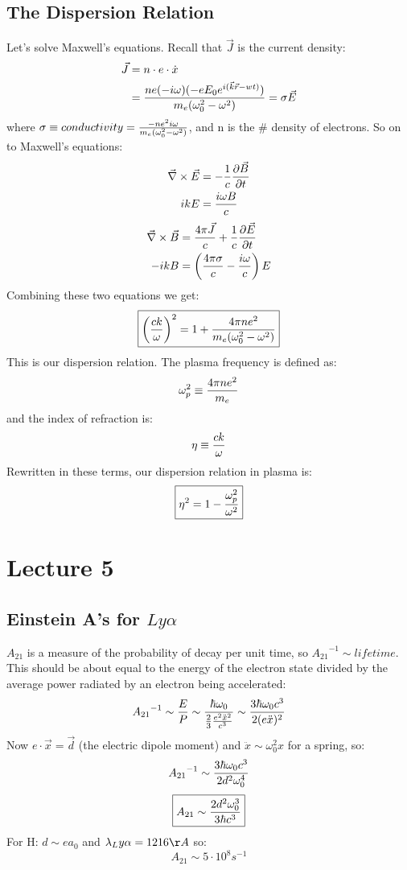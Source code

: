 \documentclass[11pt]{article}
\def\.{\dot}
\def\tr{\nabla}
\def\dce{\vec\tr\times\vec E}
\def\dcb{\vec\tr\times\vec B}
\def\wz{\omega_0}
\def\ef{\vec E}
\def\ato{{A_{21}}}
\def\bfield{{\vec B}}
\def\e#1{\cdot10^{#1}}
\begin{document}
\subsection*{ The Dispersion Relation}

Let's solve Maxwell's equations.  Recall that $\vec J$ is the current density:
$$\begin{aligned}\vec J&=n\cdot e\cdot\.x\\ 
&={ne(-i\omega)(-eE_0\eikrwt)\over m_e(\wz^2-\omega^2)}=\sigma\ef\\ \end{aligned}$$
where $\sigma\equiv conductivity={-ne^2i\omega\over m_e(\wz^2-\omega^2)}$, and
n is the \# density of electrons.
So on to Maxwell's equations:
$$\begin{aligned}\dce&=-{1\over c}{\partial\bfield\over\partial t}\\ 
ikE&={i\omega B\over c}\\ \end{aligned}$$
$$\begin{aligned}\dcb&={4\pi\vec J\over c}+{1\over c}{\partial\ef\over\partial t}\\ 
-ikB&=\left({4\pi\sigma\over c}-{i\omega\over c}\right)E\\ \end{aligned}$$
Combining these two equations we get:
$$\boxed{\left({ck\over\omega}\right)^2=1+{4\pi ne^2\over 
m_e(\wz^2-\omega^2)}}$$
This is our dispersion relation.  The plasma frequency is defined as:
$$\omega_p^2\equiv {4\pi ne^2\over m_e}$$
and the index of refraction is:
$$\eta\equiv{ck\over\omega}$$
Rewritten in these terms, our dispersion relation in plasma is:
$$\boxed{\eta^2=1-{\omega_p^2\over\omega^2}}$$

\section*{ Lecture 5 }

\def\lya{Ly\alpha}
\subsection*{ Einstein A's for $\lya$}

$\ato$ is a measure of the probability of decay per unit time, so
$\ato^{-1}\sim lifetime$.  This should be about
equal to the energy of the electron state divided by the average power radiated
by an electron being accelerated:
$$\ato^{-1}\sim{E\over P}\sim{\hbar\omega_0\over{2\over3}{e^2\ddot x^2
\over c^3}}
\sim{3\hbar\omega_0c^3\over2(e\ddot x)^2}$$
Now $e\cdot\vec x=\vec d$ (the electric dipole moment) and
$\ddot x\sim\omega_0^2x$ for a spring, so:
$$\ato^{-1}\sim{3\hbar\wz c^3\over2d^2\wz^4}$$
$$\boxed{\ato\sim{2d^2\wz^3\over3\hbar c^3}}$$
For H: $d\sim ea_0$ and $\lambda_\lya=1216\AA$ so:
$$\ato\sim5\e8s^{-1}$$
\end{document}
